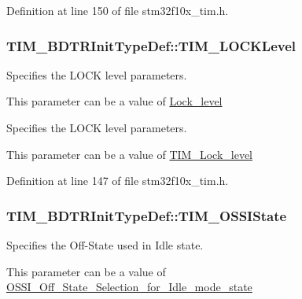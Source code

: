 Definition at line 150 of file stm32f10x\-\_\-tim.\-h.

\hypertarget{struct_t_i_m___b_d_t_r_init_type_def_aa5296a7b194d25b16899f6a98da01f03}{
\subsubsection[{T\-I\-M\-\_\-\-L\-O\-C\-K\-Level}]{ T\-I\-M\-\_\-\-B\-D\-T\-R\-Init\-Type\-Def\-::\-T\-I\-M\-\_\-\-L\-O\-C\-K\-Level}}\label{struct_t_i_m___b_d_t_r_init_type_def_aa5296a7b194d25b16899f6a98da01f03}
\begin{DoxyVerb}        Specifies the LOCK level parameters.
\end{DoxyVerb}
 This parameter can be a value of \hyperlink{group___lock__level}{Lock\-\_\-level}

\begin{DoxyVerb}        Specifies the LOCK level parameters.
\end{DoxyVerb}
 This parameter can be a value of \hyperlink{group___t_i_m___lock__level}{T\-I\-M\-\_\-\-Lock\-\_\-level} 

Definition at line 147 of file stm32f10x\-\_\-tim.\-h.

\hypertarget{struct_t_i_m___b_d_t_r_init_type_def_ad8891e3739a7db8a45343d4e2f9d2824}{
\subsubsection[{T\-I\-M\-\_\-\-O\-S\-S\-I\-State}]{ T\-I\-M\-\_\-\-B\-D\-T\-R\-Init\-Type\-Def\-::\-T\-I\-M\-\_\-\-O\-S\-S\-I\-State}}\label{struct_t_i_m___b_d_t_r_init_type_def_ad8891e3739a7db8a45343d4e2f9d2824}
\begin{DoxyVerb}        Specifies the Off-State used in Idle state.
\end{DoxyVerb}
 This parameter can be a value of \hyperlink{group___o_s_s_i___off___state___selection__for___idle__mode__state}{O\-S\-S\-I\-\_\-\-Off\-\_\-\-State\-\_\-\-Selection\-\_\-for\-\_\-\-Idle\-\_\-mode\-\_\-state}

